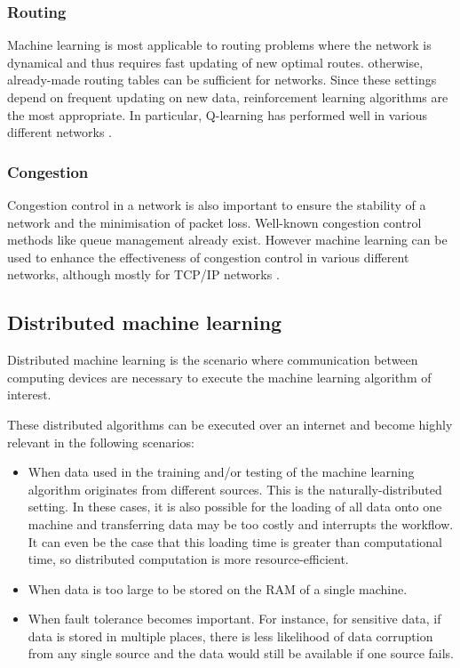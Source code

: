 \documentclass[twocolumn, aps, rmp, amsmath, amssymb, nofootinbib, superscriptaddress, longbibliography, floatfix, table-of-contents, eqsecnum]{revtex4-2}
\begin{document}
\subsubsection{Routing}

Machine learning is most applicable to routing problems where the network is dynamical and thus requires fast updating of new optimal routes. otherwise, already-made routing tables can be sufficient for networks. Since these settings depend on frequent updating on new data, reinforcement learning algorithms are the most appropriate. In particular, Q-learning has performed well in various different networks \cite{wang2006adaptive, forster2007froms, arroyo2007q}.

\subsubsection{Congestion}

Congestion control in a network is also important to ensure the stability of a network and the minimisation of packet loss. Well-known congestion control methods like queue management already exist. However machine learning can be used to enhance the effectiveness of congestion control in various different networks, although mostly for TCP/IP networks \cite{liu2002end, barman2004model, el2005improving}. 


\subsection{Distributed machine learning}

Distributed machine learning is the scenario where communication between computing devices are necessary to execute the machine learning algorithm of interest.

These distributed algorithms can be executed over an internet and become highly relevant in the following scenarios:
\begin{itemize}
\item When data used in the training and/or testing of the machine learning algorithm originates from different sources. This is the naturally-distributed setting. In these cases, it is also possible for the loading of all data onto one machine and transferring data may be too costly and interrupts the workflow. It can even be the case that this loading time is greater than computational time, so distributed computation is more resource-efficient.
\item When data is too large to be stored on the RAM of a single machine.
\item When fault tolerance becomes important. For instance, for sensitive data, if data is stored in multiple places, there is less likelihood of data corruption from any single source and the data would still be available if one source fails.
\end{itemize}
\end{document}
